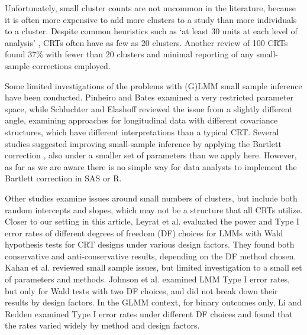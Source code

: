 \documentclass[twocolumn]{bmcart}%
\begin{document}
Unfortunately, small cluster counts are not uncommon in the literature, because it is often more expensive to add more clusters to a study than more individuals to a cluster. Despite common heuristics such as `at least 30 units at each level of analysis' \cite{kreft_introducing_1998}, CRTs often have as few as 20 clusters. Another review of 100 CRTs \cite{kahan_increased_2016} found 37\% with fewer than 20 clusters and minimal reporting of any small-sample corrections employed.

Some limited investigations of the problems with (G)LMM small sample inference have been conducted. Pinheiro and Bates \cite{pinheiro_mixed-effects_2009} examined a very restricted parameter space, while Schluchter and Elashoff \cite{schluchter_small-sample_1990} reviewed the issue from a slightly different angle, examining approaches for longitudinal data with different covariance structures, which have different interpretations than a typical CRT. Several studies \cite{zucker_improved_2000, melo_improved_2009, manor_small_2004, stein_alternatives_2014} suggested improving small-sample inference by applying the Bartlett correction \cite{bartlett_properties_1937}, also under a smaller set of parameters than we apply here. However, as far as we are aware there is no simple way for data analysts to implement the Bartlett correction in SAS or R.  

Other studies \cite{luke_evaluating_2017, maas_sufficient_2005, bell_dancing_2010} examine issues around small numbers of clusters, but include both random intercepts and slopes, which may not be a structure that all CRTs utilize. Closer to our setting in this article, Leyrat et al. \cite{leyrat_cluster_2018} evaluated the power and Type I error rates of different degrees of freedom (DF) choices for LMMs with Wald hypothesis tests for CRT designs under various design factors. They found both conservative and anti-conservative results, depending on the DF method chosen. Kahan et al. \cite{kahan_increased_2016} reviewed small sample issues, but limited investigation to a small set of parameters and methods. Johnson et al. \cite{johnson_recommendations_2015} examined LMM Type I error rates, but only for Wald tests with two DF choices, and did not break down their results by design factors. In the GLMM context, for binary outcomes only, Li and Redden \cite{li_comparing_2015} examined Type I error rates under different DF choices and found that the rates varied widely by method and design factors.
\end{document}
